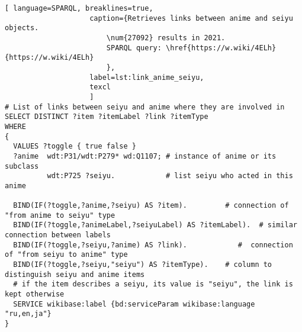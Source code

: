 \begin{widepar}%
    \captionsetup[lstlisting]{format=llapwide16}%
%
\begin{lstlisting}[ language=SPARQL, breaklines=true,
                    caption={Retrieves links between anime and seiyu objects.
                        \num{27092} results in 2021.
                        SPARQL query: \href{https://w.wiki/4ELh}{https://w.wiki/4ELh}
                        },
                    label=lst:link_anime_seiyu,
                    texcl 
                    ]
# List of links between seiyu and anime where they are involved in
SELECT DISTINCT ?item ?itemLabel ?link ?itemType
WHERE
{
  VALUES ?toggle { true false }
  ?anime  wdt:P31/wdt:P279* wd:Q1107; # instance of anime or its subclass
          wdt:P725 ?seiyu.            # list seiyu who acted in this anime
  
  BIND(IF(?toggle,?anime,?seiyu) AS ?item).         # connection of "from anime to seiyu" type
  BIND(IF(?toggle,?animeLabel,?seiyuLabel) AS ?itemLabel).  # similar connection between labels
  BIND(IF(?toggle,?seiyu,?anime) AS ?link).            #  connection of "from seiyu to anime" type
  BIND(IF(?toggle,?seiyu,"seiyu") AS ?itemType).    # column to distinguish seiyu and anime items
  # if the item describes a seiyu, its value is "seiyu", the link is kept otherwise
  SERVICE wikibase:label {bd:serviceParam wikibase:language "ru,en,ja"}
}
\end{lstlisting}%
\end{widepar}


\begin{figure*}[h]

    \setlength{\fboxsep}{0pt}%
    \setlength{\fboxrule}{1pt}%
	\caption[Histogram of number of anime voiced by seiyu of different ages, 2021.]{Histogram of number of anime voiced by seiyu of different ages, 2021. The histogram was created according to the output of queries~\protect\ref{lst:seiyu_bd_w_service} (or~\protect\ref{lst:seiyu_bd_w_rdfs}), \protect\ref{lst:all_anime_releases} and \protect\ref{lst:link_anime_seiyu}.}%
    \label{fig:Seiyu_age_hist_EN}%
\end{figure*} 


